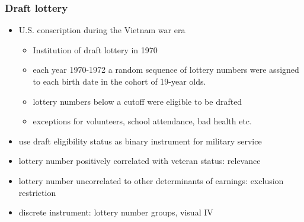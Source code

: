\documentclass[pdftex]{beamer}
\begin{document}
\begin{frame}
\frametitle{Draft lottery}

\begin{itemize}
\item U.S. conscription during the Vietnam war era
	\begin{itemize}
		\item Institution of draft lottery in 1970
		\item each year 1970-1972 a random sequence of lottery numbers were assigned to each birth date in the cohort of 19-year olds.
		\item lottery numbers below a cutoff were eligible to be drafted
		\item exceptions for volunteers, school attendance, bad health etc.
	\end{itemize}
\item use draft eligibility status as binary instrument for military service
\item lottery number positively correlated with veteran status: relevance
\item lottery number uncorrelated to other determinants of earnings: exclusion restriction
\item discrete instrument: lottery number groups, visual IV
\end{itemize}

\end{frame}
\end{document}
